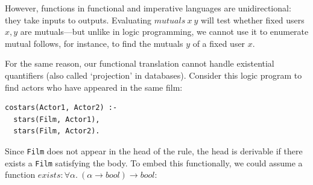 \documentclass[runningheads]{llncs}
\newcommand\name[1]{\ensuremath{\mathit{#1}}}
\newcommand\<\:                 %
\newcommand\fnspace{\<}         %
\newcommand\fa[1]{\forall{#1}.\fnspace}
\newcommand\typename\textit
\newcommand\bool{\typename{bool}}
\begin{document}

\noindent
However, functions in functional and imperative languages are unidirectional: they take inputs to outputs.
Evaluating $\name{mutuals} \<x \<y$ will test whether fixed users $x, y$ are mutuals---but unlike in logic programming, we cannot use it to enumerate mutual follows, for instance, to find the mutuals $y$ of a fixed user $x$.%


For the same reason, our functional translation cannot handle existential quantifiers (also called `projection' in databases). Consider this logic program to find actors who have appeared in the same film:

\begin{lstlisting}
costars(Actor1, Actor2) :-
  stars(Film, Actor1),
  stars(Film, Actor2).
\end{lstlisting}


\noindent
Since \lstinline{Film} does not appear in the head of the rule, the head is derivable if there exists a \lstinline{Film} satisfying the body.
To embed this functionally, we could assume a function $\name{exists} : \fa{\alpha} (\alpha \to \bool) \to \bool$:
\end{document}
